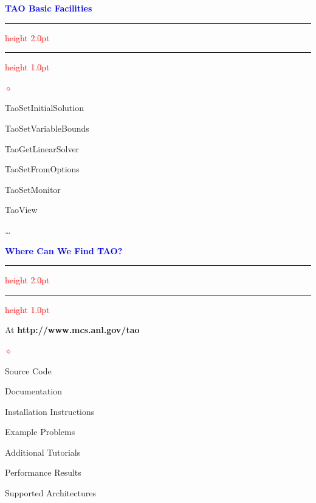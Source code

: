 \documentclass{seminar}
\newcommand{\reddiamond}{\textcolor{red}{$\diamond$}}
\newcommand{\redstripe}{\textcolor{red}{\hrule height 2.0pt\hfil}
             \vspace{-1.8pt}
             \textcolor{red}{\hrule height 1.0pt\hfil}
}
\newcommand{\heading}[1]{%
   \centerline{\textcolor{blue}{\textbf{#1}}}%
    \redstripe%
    \bigskip
}
\begin{document}
\begin{slide}

\heading{TAO Basic Facilities}

\begin{list}{\reddiamond}{}
\item
TaoSetInitialSolution
\item
TaoSetVariableBounds
\item
TaoGetLinearSolver
\item 
TaoSetFromOptions
\item
TaoSetMonitor
\item
TaoView
\item
\ldots
\end{list}

\vfill

\end{slide}

\begin{slide}
\heading{Where Can We Find TAO?}

At {\bf http://www.mcs.anl.gov/tao}

\begin{list}{\reddiamond}{\leftmargin=1in}
\item
Source Code
\item
Documentation
\item
Installation Instructions
\item
Example Problems
\item
Additional Tutorials
\item
Performance Results
\item
Supported Architectures
\end{list}

\vfill

\end{slide}
\end{document}
